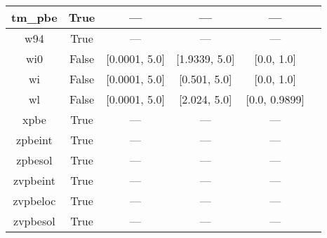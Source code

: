 \begin{tabular}{|c|c|c|c|c|l|}
       tm\_pbe &                  True &              --- &              --- &            --- &                                      \cite{Thakkar2009_134109} \\ \hline
           w94 &                  True &              --- &              --- &            --- &                                          \cite{Wilson1994_337} \\ \hline
           wi0 &                 False &    [0.0001, 5.0] &    [1.9339, 5.0] &     [0.0, 1.0] &                                          \cite{Wilson1998_523} \\ \hline
            wi &                 False &    [0.0001, 5.0] &     [0.501, 5.0] &     [0.0, 1.0] &                                          \cite{Wilson1998_523} \\ \hline
            wl &                 False &    [0.0001, 5.0] &     [2.024, 5.0] &  [0.0, 0.9899] &                                        \cite{Wilson1990_12930} \\ \hline
          xpbe &                  True &              --- &              --- &            --- &                                             \cite{Xu2004_4068} \\ \hline
       zpbeint &                  True &              --- &              --- &            --- &                                   \cite{Constantin2011_233103} \\ \hline
       zpbesol &                  True &              --- &              --- &            --- &                                   \cite{Constantin2011_233103} \\ \hline
      zvpbeint &                  True &              --- &              --- &            --- &                                   \cite{Constantin2012_194105} \\ \hline
      zvpbeloc &                  True &              --- &              --- &            --- &                                         \cite{Fabiano2015_122} \\ \hline
      zvpbesol &                  True &              --- &              --- &            --- &                                   \cite{Constantin2012_194105} \\ \hline
\end{tabular}